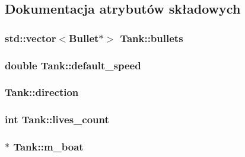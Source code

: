 \subsection{Dokumentacja atrybutów składowych}
\hypertarget{class_tank_a85d5a28cc0e589748644bdf2879745cb}{}
\subsubsection[{bullets}]{\setlength{\rightskip}{0pt plus 5cm}std\+::vector$<${\bf Bullet}$\ast$$>$ Tank\+::bullets}\label{class_tank_a85d5a28cc0e589748644bdf2879745cb}
\hypertarget{class_tank_acd370abc3ccd4c67c8285e42884c7b1c}{}
\subsubsection[{default\+\_\+speed}]{\setlength{\rightskip}{0pt plus 5cm}double Tank\+::default\+\_\+speed}\label{class_tank_acd370abc3ccd4c67c8285e42884c7b1c}
\hypertarget{class_tank_a316c67f799b64265a676038da73b0676}{}
\subsubsection[{direction}]{ Tank\+::direction}\label{class_tank_a316c67f799b64265a676038da73b0676}
\hypertarget{class_tank_abb0e870d0f5ecdb44adf6c1136536822}{}
\subsubsection[{lives\+\_\+count}]{\setlength{\rightskip}{0pt plus 5cm}int Tank\+::lives\+\_\+count}\label{class_tank_abb0e870d0f5ecdb44adf6c1136536822}
\hypertarget{class_tank_afc71fe83709cbe9df5413f04213a5a3b}{}
\subsubsection[{m\+\_\+boat}]{$\ast$ Tank\+::m\+\_\+boat\hspace{0.3cm}{\ttfamily [protected]}}\label{class_tank_afc71fe83709cbe9df5413f04213a5a3b}
\hypertarget{class_tank_a2a6fb83df6ad84e8b3145f36d25b0ced}{}
